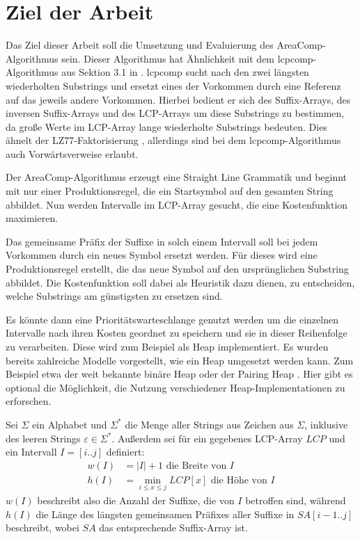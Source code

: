 \chapter{Ziel der Arbeit}

Das Ziel dieser Arbeit soll die Umsetzung und Evaluierung des AreaComp-Algorithmus sein. Dieser Algorithmus hat Ähnlichkeit mit dem lcpcomp-Algorithmus aus Sektion 3.1 in \cite{dinklage_compression_2017}.
lcpcomp sucht nach den zwei längsten wiederholten Substrings und ersetzt eines der Vorkommen durch eine Referenz auf das jeweils andere Vorkommen.
Hierbei bedient er sich des Suffix-Arrays, des inversen Suffix-Arrays und des LCP-Arrays \cite{manber_suffix_1993} um diese Substrings zu bestimmen, da große Werte im LCP-Array lange wiederholte Substrings bedeuten. Dies ähnelt der LZ77-Faktorisierung \cite{ziv_universal_1977}, allerdings sind bei dem lcpcomp-Algorithmus auch Vorwärtsverweise erlaubt.

Der AreaComp-Algorithmus erzeugt eine Straight Line Grammatik und beginnt mit nur einer Produktionsregel, die ein Startsymbol auf den gesamten String abbildet.
Nun werden Intervalle im LCP-Array gesucht, die eine Kostenfunktion maximieren. 

Das gemeinsame Präfix der Suffixe in solch einem Intervall soll bei jedem Vorkommen durch ein neues Symbol ersetzt werden. Für dieses wird eine Produktionsregel erstellt, die das neue Symbol auf den ursprünglichen Substring abbildet. Die Kostenfunktion soll dabei als Heuristik dazu dienen, zu entscheiden, welche Substrings am günstigsten zu ersetzen sind.

Es könnte dann eine Prioritätswarteschlange genutzt werden um die einzelnen Intervalle nach ihren Kosten geordnet zu speichern und sie in dieser Reihenfolge zu verarbeiten. 
Diese wird zum Beispiel als Heap implementiert. Es wurden bereits zahlreiche Modelle vorgestellt, wie ein Heap umgesetzt werden kann. Zum Beispiel etwa der weit bekannte binäre Heap \cite{williams_algorithm_1964} oder der Pairing Heap \cite{fredman_pairing_1986}. Hier gibt es optional die Möglichkeit, die Nutzung verschiedener Heap-Implementationen \cite{larkin_back--basics_2013} zu erforschen.

Sei $\Sigma$ ein Alphabet und $\Sigma^*$ die Menge aller Strings aus Zeichen aus $\Sigma$, inklusive des leeren Strings $\varepsilon \in \Sigma^*$. Außerdem sei für ein gegebenes LCP-Array $LCP$ und ein Intervall $I = [i..j]$ definiert:
\begin{align*}
    w(I) &= |I| + 1 \text{ die Breite von $I$}\\
    h(I) &= \min_{i \leq x \leq j} LCP[x] \text{ die Höhe von $I$} 
\end{align*}
$w(I)$ beschreibt also die Anzahl der Suffixe, die von $I$ betroffen sind, während $h(I)$ die Länge des längsten gemeinsamen Präfixes aller Suffixe in $SA[i - 1..j]$ beschreibt, wobei $SA$ das entsprechende Suffix-Array ist.

